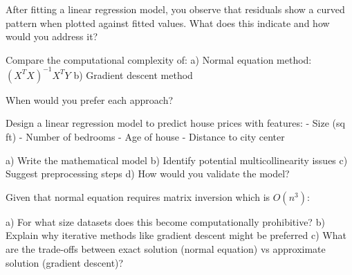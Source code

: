 \documentclass{article}
\newcounter{exercise}
\begin{document}
\begin{tcolorbox}[colback=gray!5!white,colframe=gray!75!black,title=Problem \stepcounter{exercise}: Residual Analysis]

After fitting a linear regression model, you observe that residuals show a curved pattern when plotted against fitted values. What does this indicate and how would you address it?
\end{tcolorbox}

\begin{tcolorbox}[colback=gray!5!white,colframe=gray!75!black,title=Problem \stepcounter{exercise}: Computational Complexity]

Compare the computational complexity of:
a) Normal equation method: $(X^T X)^{-1} X^T Y$
b) Gradient descent method

When would you prefer each approach?
\end{tcolorbox}

\begin{tcolorbox}[colback=gray!5!white,colframe=gray!75!black,title=Problem \stepcounter{exercise}: Real-world Application]

Design a linear regression model to predict house prices with features:
- Size (sq ft)
- Number of bedrooms  
- Age of house
- Distance to city center

a) Write the mathematical model
b) Identify potential multicollinearity issues
c) Suggest preprocessing steps
d) How would you validate the model?
\end{tcolorbox}

\begin{tcolorbox}[colback=gray!5!white,colframe=gray!75!black,title=Problem \stepcounter{exercise}: Advanced Challenge]

Given that normal equation requires matrix inversion which is $O(n^3)$:

a) For what size datasets does this become computationally prohibitive?
b) Explain why iterative methods like gradient descent might be preferred
c) What are the trade-offs between exact solution (normal equation) vs approximate solution (gradient descent)?
\end{tcolorbox}
\end{document}
